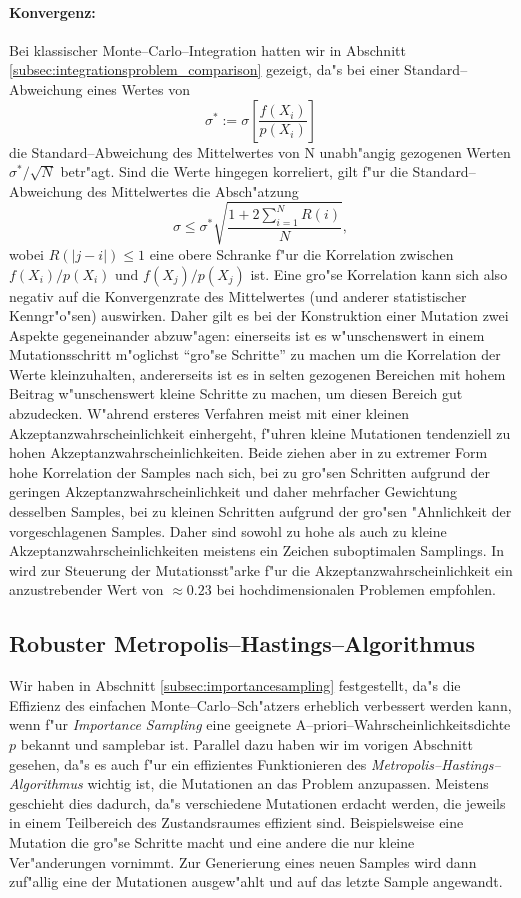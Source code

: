 	\paragraph{Konvergenz:}Bei klassischer Monte--Carlo--Integration hatten wir in Abschnitt \ref{subsec:integrationsproblem_comparison} gezeigt, da"s bei einer Standard--Abweichung eines Wertes von $$\sigma^*:=\sigma\left[\frac{f(X_i)}{p(X_i)}\right]$$ die Standard--Abweichung des Mittelwertes von N unabh"angig gezogenen Werten $\sigma^*/\sqrt{N}$ betr"agt. Sind die Werte hingegen korreliert, gilt f"ur die Standard--Abweichung des Mittelwertes die Absch"atzung \citep[siehe][VII.\;\S3(8)]{Renyi:1964p10655}
	$$\sigma\leq \sigma^*\sqrt{\frac{1+2\sum_{i=1}^N R(i)}{N}},$$
	wobei $R(|j-i|)\leq 1$ eine obere Schranke f"ur die Korrelation zwischen $f(X_i)/p(X_i)$ und $f(X_j)/p(X_j)$ ist.
	Eine gro"se Korrelation kann sich also negativ auf die Konvergenzrate des Mittelwertes (und anderer statistischer Kenngr"o"sen) auswirken. Daher gilt es bei der Konstruktion einer Mutation zwei Aspekte gegeneinander abzuw"agen: einerseits ist es w"unschenswert in einem Mutationsschritt m"oglichst ``gro"se Schritte'' zu machen um die Korrelation der Werte kleinzuhalten, andererseits ist es in selten gezogenen Bereichen mit hohem Beitrag w"unschenswert kleine Schritte zu machen, um diesen Bereich gut abzudecken. W"ahrend ersteres Verfahren meist mit einer kleinen Akzeptanzwahrscheinlichkeit einhergeht, f"uhren kleine Mutationen tendenziell zu hohen Akzeptanzwahrscheinlichkeiten. Beide ziehen aber in zu extremer Form hohe Korrelation der Samples nach sich, bei zu gro"sen Schritten aufgrund der geringen Akzeptanzwahrscheinlichkeit und daher mehrfacher Gewichtung desselben Samples, bei zu kleinen Schritten aufgrund der gro"sen "Ahnlichkeit der vorgeschlagenen Samples. Daher sind sowohl zu hohe als auch zu kleine Akzeptanzwahrscheinlichkeiten meistens ein Zeichen suboptimalen Samplings. In \citep{Roberts:1997p5198} wird zur Steuerung der Mutationsst"arke f"ur die Akzeptanzwahrscheinlichkeit ein anzustrebender Wert von $\approx 0.23$ bei hochdimensionalen Problemen empfohlen.

	
	
	\subsection{Robuster Metropolis--Hastings--Algorithmus}
	Wir haben in Abschnitt \ref{subsec:importancesampling} festgestellt, da"s die Effizienz des einfachen Monte--Carlo--Sch"atzers erheblich verbessert werden kann, wenn f"ur {\em Importance Sampling} eine geeignete A--priori--Wahrscheinlichkeitsdichte $p$ bekannt und samplebar ist. Parallel dazu haben wir im vorigen Abschnitt gesehen, da"s es auch f"ur ein effizientes Funktionieren des {\em Metropolis--Hastings--Algorithmus} wichtig ist, die Mutationen an das Problem anzupassen. Meistens geschieht dies dadurch, da"s verschiedene Mutationen erdacht werden, die jeweils in einem Teilbereich des Zustandsraumes effizient sind. Beispielsweise eine Mutation die gro"se Schritte macht und eine andere die nur kleine Ver"anderungen vornimmt. Zur Generierung eines neuen Samples wird dann zuf"allig eine der Mutationen ausgew"ahlt und auf das letzte Sample angewandt.
	
